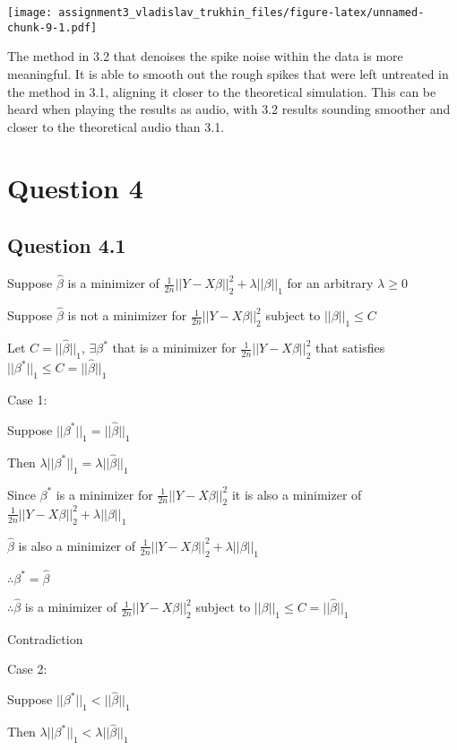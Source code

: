 \documentclass[
]{article}
\begin{document}
\texttt{[image: assignment3\_vladislav\_trukhin\_files/figure-latex/unnamed-chunk-9-1.pdf]}

The method in 3.2 that denoises the spike noise within the data is more
meaningful. It is able to smooth out the rough spikes that were left
untreated in the method in 3.1, aligning it closer to the theoretical
simulation. This can be heard when playing the results as audio, with
3.2 results sounding smoother and closer to the theoretical audio than
3.1.

\hypertarget{question-4}{%
\section{Question 4}\label{question-4}}

\hypertarget{question-4.1}{%
\subsection{Question 4.1}\label{question-4.1}}

Suppose \(\hat\beta\) is a minimizer of
\(\frac{1}{2n}||Y-X\beta||^2_2+\lambda||\beta||_1\) for an arbitrary
\(\lambda \geq 0\)

Suppose \(\hat\beta\) is not a minimizer for
\(\frac{1}{2n}||Y-X\beta||^2_2\) subject to \(||\beta||_1\leq C\)

Let \(C= ||\hat\beta||_1\), \(\exists \beta^*\) that is a minimizer for
\(\frac{1}{2n}||Y-X\beta||^2_2\) that satisfies
\(||\beta^*||_1\leq C= ||\hat\beta||_1\)

Case 1:

Suppose \(||\beta^*||_1= ||\hat\beta||_1\)

Then \(\lambda||\beta^*||_1 = \lambda||\hat\beta||_1\)

Since \(\beta^*\) is a minimizer for \(\frac{1}{2n}||Y-X\beta||^2_2\) it
is also a minimizer of
\(\frac{1}{2n}||Y-X\beta||^2_2+\lambda||\beta||_1\)

\(\hat\beta\) is also a minimizer of
\(\frac{1}{2n}||Y-X\beta||^2_2+\lambda||\beta||_1\)

\(\therefore \beta^*= \hat\beta\)

\(\therefore \hat\beta\) is a minimizer of
\(\frac{1}{2n}||Y-X\beta||^2_2\) subject to
\(||\beta||_1\leq C= ||\hat\beta||_1\)

Contradiction

Case 2:

Suppose \(||\beta^*||_1< ||\hat\beta||_1\)

Then \(\lambda||\beta^*||_1 < \lambda||\hat\beta||_1\)
\end{document}
